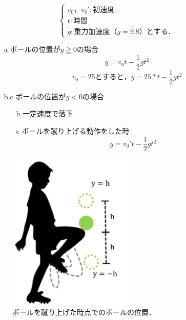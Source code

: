 \[
    \begin{cases}
        v_0，v_0': 初速度 & \\
        t: 時間 & \\
        g: 重力加速度（g=9.8）とする． &
    \end{cases}
\]

\vspace{1cm}

\begin{itemize}
    \item[a] ボールの位置が$y \geqq 0$の場合
        \begin{equation}
            y=v_0t-\frac{1}{2}gt^2
        \end{equation}
        \begin{equation}
            v_0=25とすると，y=25*t-\frac{1}{2}gt^2
        \end{equation}
    \item[b,c] ボールの位置が$y < 0$の場合
        \begin{itemize}
            \item[b] 一定速度で落下
            \item[c] ボールを蹴り上げる動作をした時
                \begin{equation}
                    y=v_0't-\frac{1}{2}gt^2
                \end{equation}
        \end{itemize}
\end{itemize}

\vspace{1.5cm}

\begin{figure}[htbp]
    \centering
    \includegraphics[width=6cm]{image/ballenzan.png}
    \caption[ボールを蹴り上げた時点でのボールの位置]{ボールを蹴り上げた時点でのボールの位置．}
  \label{enzan}
\end{figure}

